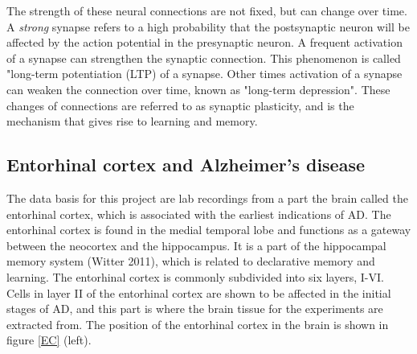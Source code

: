 The  strength of these neural connections are not fixed, but can change over time. A \textit{strong} synapse refers to a high probability that the postsynaptic neuron will be affected by the action potential in the presynaptic neuron. A frequent activation of a synapse can strengthen the synaptic connection. This phenomenon is called "long-term potentiation (LTP) of a synapse. Other times activation of a synapse can weaken the connection over time, known as "long-term depression". These changes of connections are referred to as synaptic plasticity, and is the mechanism that gives rise to learning and memory. \\

\subsection{Entorhinal cortex and Alzheimer's disease}
\label{EandA}


The data basis for this project are lab recordings from a part the brain called the entorhinal cortex, which is associated with the earliest indications of AD. The entorhinal cortex is found in the medial temporal lobe and functions as a gateway between the neocortex and the hippocampus. It is a part of the hippocampal memory system (Witter 2011), which is related to declarative memory and learning. The entorhinal cortex is commonly subdivided into six layers, I-VI. Cells in layer II of the entorhinal cortex are shown to be affected in the initial stages of AD, and this part is where the brain tissue for the experiments are extracted from. The position  of the entorhinal cortex in the brain is shown in figure \ref{EC} (left).

